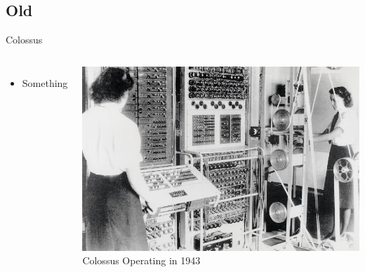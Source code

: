 \documentclass{beamer}
\begin{document}
\subsection[Firsts]{Old}

\begin{frame}{Colossus}
  \begin{columns}
    
    \begin{itemize}
    \item
      Something
    \end{itemize}
    
    \begin{center}
      \includegraphics[scale=0.4]{../assets/ColossusOperation.eps}
      \cite{Colossus1943} Colossus Operating in 1943
    \end{center}
    
  \end{columns}
\end{frame}
\end{document}
